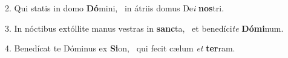 2. Qui statis in domo \textbf{Dó}mini, \ast\  in átriis domus De\textit{i} \textbf{nos}tri.\

3. In nóctibus extóllite manus vestras in \textbf{sanc}ta, \ast\  et benedíci\textit{te} \textbf{Dó}\textbf{mi}num.\

4. Benedícat te Dóminus ex \textbf{Si}on, \ast\  qui fecit cælum \textit{et} \textbf{ter}ram.\

